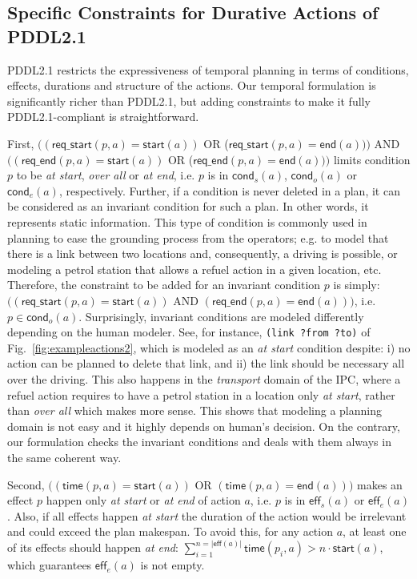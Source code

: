 \documentclass[runningheads]{llncs}
\newcommand{\eff}{\mathsf{eff}}    %
\newcommand{\cond}{\mathsf{cond}}  %
\newcommand{\start}{\mathsf{start}}%
\newcommand{\en}{\mathsf{end}}     %
\newcommand{\tim}{\mathsf{time}}   %
\newcommand{\reqs}{\mathsf{req\_{start}}} %
\newcommand{\reqe}{\mathsf{req\_{end}}}   %
\begin{document}
\subsection{Specific Constraints for Durative Actions of PDDL2.1}
\label{sec:PDDL21constraints}

PDDL2.1 restricts the expressiveness of temporal planning in terms of conditions, effects, durations and structure of the actions. Our temporal formulation is significantly richer than PDDL2.1, but adding constraints to make it fully PDDL2.1-compliant is straightforward.


First, $((\reqs(p,a) = \start(a))$ OR ($\reqs(p,a) = \en(a)))$ AND $((\reqe(p,a) = \start(a))$ OR ($\reqe(p,a) = \en(a)))$ limits condition $p$ to be \emph{at start}, \emph{over all} or \emph{at end}, i.e. $p$ is in $\cond_s(a)$, $\cond_o(a)$ or $\cond_e(a)$, respectively.
Further, if a condition is never deleted in a plan, it can be considered as an invariant condition for such a plan. In other words, it represents static information. This type of condition is commonly used in planning to ease the grounding process from the operators; e.g. to model that there is a link between two locations and, consequently, a driving is possible, or modeling a petrol station that allows a refuel action in a given location, etc. Therefore, the constraint to be added for an invariant condition $p$ is simply: $((\reqs(p,a) = \start(a))$ AND $(\reqe(p,a) = \en(a)))$, i.e. $p \in \cond_o(a)$.
Surprisingly, invariant conditions are modeled differently depending on the human modeler. See, for instance, \texttt{(link ?from ?to)} of Fig.~\ref{fig:exampleactions2}, which is modeled as an \emph{at start} condition despite: i) no action can be planned to delete that link, and ii) the link should be necessary all over the driving.
This also happens in the \emph{transport} domain of the IPC, where a refuel action requires to have a petrol station in a location only \emph{at start}, rather than \emph{over all} which makes more sense. This shows that modeling a planning domain is not easy and it highly depends on human's decision. On the contrary, our formulation checks the invariant conditions and deals with them always in the same coherent way.


Second, $((\tim(p,a) = \start(a))$ OR $(\tim(p,a) = \en(a)))$ makes an effect $p$ happen only \emph{at start} or \emph{at end} of action $a$, i.e. $p$ is in $\eff_s(a)$ or $\eff_e(a)$.
Also, if all effects happen \emph{at start} the duration of the action would be irrelevant and could exceed the plan makespan. To avoid this, for any action $a$, at least one of its effects should happen \emph{at end}: $\sum_{i=1}^{n =|\eff(a)|} \tim(p_i,a) > n \cdot \start(a)$, which guarantees $\eff_e(a)$ is not empty.
\end{document}
